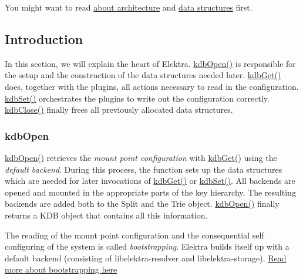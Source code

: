 You might want to read \hyperlink{doc_dev_architecture_md}{about architecture} and \hyperlink{doc_dev_data-structures_md}{data structures} first.

\subsection*{Introduction}

In this section, we will explain the heart of Elektra. {\ttfamily \hyperlink{group__kdb_ga6808defe5870f328dd17910aacbdc6ca}{kdb\+Open()}} is responsible for the setup and the construction of the data structures needed later. {\ttfamily \hyperlink{group__kdb_ga28e385fd9cb7ccfe0b2f1ed2f62453a1}{kdb\+Get()}} does, together with the plugins, all actions necessary to read in the configuration. {\ttfamily \hyperlink{group__kdb_ga11436b058408f83d303ca5e996832bcf}{kdb\+Set()}} orchestrates the plugins to write out the configuration correctly. {\ttfamily \hyperlink{group__kdb_gadb54dc9fda17ee07deb9444df745c96f}{kdb\+Close()}} finally frees all previously allocated data structures.

\subsubsection*{kdb\+Open}

{\ttfamily \hyperlink{group__kdb_ga6808defe5870f328dd17910aacbdc6ca}{kdb\+Open()}} retrieves the {\itshape mount point configuration} with {\ttfamily \hyperlink{group__kdb_ga28e385fd9cb7ccfe0b2f1ed2f62453a1}{kdb\+Get()}} using the {\itshape default backend}. During this process, the function sets up the data structures which are needed for later invocations of {\ttfamily \hyperlink{group__kdb_ga28e385fd9cb7ccfe0b2f1ed2f62453a1}{kdb\+Get()}} or {\ttfamily \hyperlink{group__kdb_ga11436b058408f83d303ca5e996832bcf}{kdb\+Set()}}. All backends are opened and mounted in the appropriate parts of the key hierarchy. The resulting backends are added both to the {\ttfamily Split} and the {\ttfamily Trie} object. {\ttfamily \hyperlink{group__kdb_ga6808defe5870f328dd17910aacbdc6ca}{kdb\+Open()}} finally returns a {\ttfamily K\+DB} object that contains all this information.

The reading of the mount point configuration and the consequential self configuring of the system is called {\itshape bootstrapping}. Elektra builds itself up with a default backend (consisting of {\ttfamily libelektra-\/resolver} and {\ttfamily libelektra-\/storage}). \hyperlink{doc_help_elektra-bootstrapping_md}{Read more about bootstrapping here}

